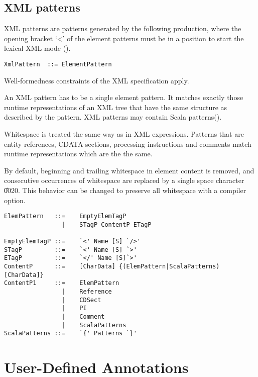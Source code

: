 \section{XML patterns}\label{sec:xml-pats}
XML patterns are patterns generated by the following production, where
the opening bracket `<' of the element patterns must be in a position
to start the lexical XML mode ().

\syntax\begin{lstlisting}
XmlPattern  ::= ElementPattern 
\end{lstlisting}%
Well-formedness constraints of the XML specification apply.

An XML pattern has to be a single element pattern. It %
matches exactly those runtime
representations of an XML tree
that have the same structure as described by the pattern. %
XML patterns may contain Scala patterns().

Whitespace is treated the same way as in XML expressions. Patterns 
that are entity references, CDATA sections, processing 
instructions and comments match runtime representations which are the
the same.

By default, beginning and trailing whitespace in element content is removed, 
and consecutive occurrences of whitespace are replaced by a single space
character \U{0020}. This behavior can be changed to preserve all whitespace
with a compiler option.

\syntax\begin{lstlisting}
ElemPattern   ::=    EmptyElemTagP
                |    STagP ContentP ETagP                                    

EmptyElemTagP ::=    `<' Name [S] `/>'
STagP         ::=    `<' Name [S] `>'                          
ETagP         ::=    `</' Name [S]`>'                                        
ContentP      ::=    [CharData] {(ElemPattern|ScalaPatterns) [CharData]}
ContentP1     ::=    ElemPattern
                |    Reference
                |    CDSect
                |    PI
                |    Comment
                |    ScalaPatterns
ScalaPatterns ::=    `{' Patterns `}'
\end{lstlisting}


\chapter{User-Defined Annotations}
\label{sec:annotations}

